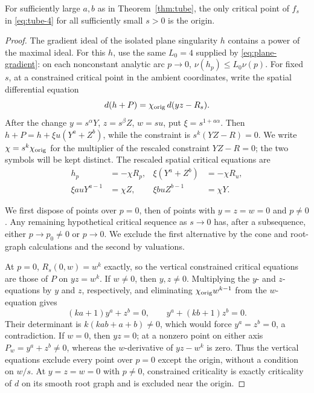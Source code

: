 \begin{lemma}\label{lem:isolation}
For sufficiently large \(a,b\) as in Theorem~\ref{thm:tube},
the only critical point of \(f_s\) in \eqref{eq:tube-4} for all sufficiently
small \(s>0\) is the origin.
\end{lemma}
\begin{proof}
The gradient ideal of the isolated plane singularity \(h\) contains
a power of the maximal ideal. For this \(h\), use the same
\(L_0=4\) supplied by \eqref{eq:plane-gradient}: on each nonconstant
analytic arc \(p\to0\),
\(\nu(h_p)\le L_0\nu(p)\).
For fixed \(s\), at a constrained critical point in the ambient
coordinates, write the spatial differential equation
\[
 d(h+P)=\chi_{\rm orig}\,d(yz-R_s).
\]
After the change \(y=s^\alpha Y\), \(z=s^\beta Z\), \(w=su\),
put \(\xi=s^{1+a\alpha}\). Then
\(h+P=h+\xi u(Y^a+Z^b)\), while the constraint is
\(s^k(YZ-R)=0\). We write
\(\chi=s^k\chi_{\rm orig}\) for the multiplier of the rescaled
constraint \(YZ-R=0\); the two symbols will be kept distinct.
The rescaled spatial critical equations are
\begin{equation}
\begin{aligned}
h_p&=-\chi R_p,&
\xi(Y^a+Z^b)&=-\chi R_u,\\
\xi a uY^{a-1}&=\chi Z,&
\xi b uZ^{b-1}&=\chi Y.
\end{aligned}
\label{eq:tube-10}
\end{equation}

We first dispose of points over \(p=0\), then of points with
\(y=z=w=0\) and \(p\ne0\). Any remaining hypothetical critical
sequence as \(s\to0\) has, after a subsequence, either
\(p\to p_0\ne0\) or \(p\to0\). We exclude the first alternative
by the cone and root-graph calculations and the second by valuations.

At \(p=0\), \(R_s(0,w)=w^k\) exactly, so the vertical constrained
critical equations are those of \(P\) on \(yz=w^k\).
If \(w\ne0\), then \(y,z\ne0\). Multiplying the \(y\)- and
\(z\)-equations by \(y\) and \(z\), respectively, and eliminating
\(\chi_{\rm orig}w^{k-1}\) from the \(w\)-equation gives
\[
 (ka+1)y^a+z^b=0,\qquad y^a+(kb+1)z^b=0.
\]
Their determinant is \(k(kab+a+b)\ne0\), which would force
\(y^a=z^b=0\), a contradiction. If \(w=0\), then \(yz=0\);
at a nonzero point on either axis \(P_w=y^a+z^b\ne0\), whereas
the \(w\)-derivative of \(yz-w^k\) is zero. Thus the vertical
equations exclude every point over \(p=0\) except the origin,
without a condition on \(w/s\).
At \(y=z=w=0\) with \(p\ne0\), constrained criticality is exactly
criticality of \(d\) on its smooth root graph and is excluded
near the origin.


\end{proof}

